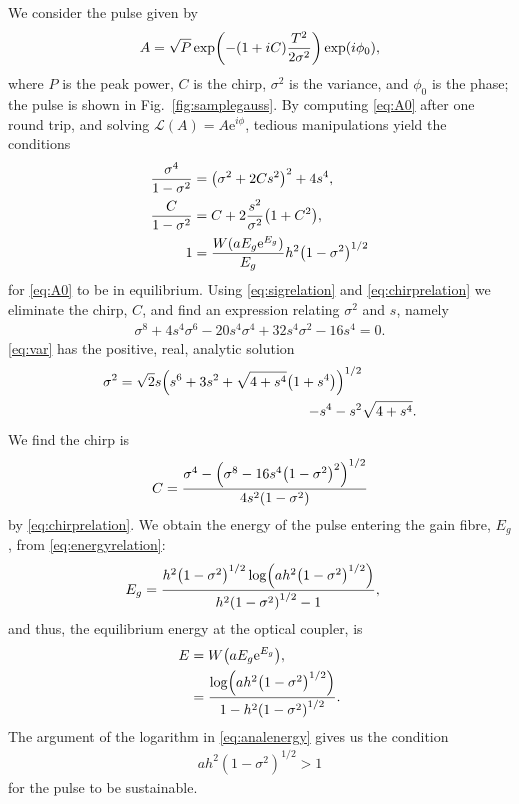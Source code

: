 \documentclass[9pt,twocolumn,twoside]{osajnl}
\let\originalleft\left
\let\originalright\right
\renewcommand{\left}{\mathopen{}\mathclose\bgroup\originalleft}
\renewcommand{\right}{\aftergroup\egroup\originalright}
\begin{document}
We consider the pulse given by
\begin{align}
	A = \sqrt{P} \exp \left( -(1 + iC) \frac{T^2}{2 \sigma^2} \right) \exp(i \phi_0),
	\label{eq:A0}
\end{align}
where $P$ is the peak power, $C$ is the chirp, $\sigma^2$ is the variance, and $\phi_0$ is the phase; the pulse is shown in Fig.~\ref{fig:samplegauss}. By computing \eqref{eq:A0} after one round trip, and solving $\mathcal{L}(A) = A \textrm{e}^{i \phi}$, tedious manipulations yield the conditions
\begin{align}
	\frac{\sigma^4}{1 - \sigma^2} &= \left( \sigma^2 + 2 C s^2 \right)^2 + 4 s^4, \label{eq:sigrelation} \\
	\frac{C}{1 - \sigma^2} &= C + 2 \frac{s^2}{\sigma^2} \left( 1 + C^2 \right), \label{eq:chirprelation} \\
	1 &= \frac{W(a E_g \textrm{e}^{E_g})}{E_g} h^2 \left( 1 - \sigma^2 \right)^{1/2} \label{eq:energyrelation}
\end{align}
for \eqref{eq:A0} to be in equilibrium. Using \eqref{eq:sigrelation} and \eqref{eq:chirprelation} we eliminate the chirp, $C$, and find an expression relating $\sigma^2$ and $s$, namely
\begin{align}
	\sigma^8 + 4 s^4 \sigma^6 - 20 s^4 \sigma^4 + 32 s^4 \sigma^2 - 16 s^4 = 0.
	\label{eq:var}
\end{align}
\eqref{eq:var} has the positive, real, analytic solution
\begin{equation}
	\begin{split}
		\sigma^2 = \sqrt{2} s \left( s^6 + 3s^2 + \sqrt{4 + s^4} \left( 1 + s^4 \right) \right)^{1/2} & \\
		- s^4 - s^2 & \sqrt{4 + s^4}.
		\label{eq:equilvar}
	\end{split}
\end{equation}
We find the chirp is
\begin{align}
	C = \frac{\sigma^4 - \left( \sigma^8 - 16 s^4 \left( 1 - \sigma^2 \right)^2 \right)^{1/2}}{4 s^2 \left( 1 - \sigma^2 \right)}
	\label{eq:chirp}
\end{align}
by \eqref{eq:chirprelation}. We obtain the energy of the pulse entering the gain fibre, $E_g$, from \eqref{eq:energyrelation}:
\begin{align}
	E_g &= \frac{h^2 \left( 1 - \sigma^2 \right)^{1/2} \log \left( a h^2 \left( 1 - \sigma^2 \right)^{1/2} \right)}{h^2 \left( 1 - \sigma^2 \right)^{1/2} - 1},
\end{align}
and thus, the equilibrium energy at the optical coupler, is
\begin{align}
	E &= W \left( a E_g \textrm{e}^{E_g} \right), \\
	&= \frac{\log \left( a h^2 \left( 1 - \sigma^2 \right)^{1/2} \right)}{1 - h^2 \left( 1 - \sigma^2 \right)^{1/2}}.
	\label{eq:analenergy}
\end{align}
The argument of the logarithm in \eqref{eq:analenergy} gives us the condition
\begin{align}
	a h^2 (1 - \sigma^2)^{1/2} > 1
	\label{eq:energycond}
\end{align}
for the pulse to be sustainable.
\end{document}
